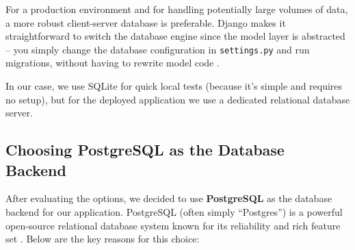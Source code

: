 For a production environment and for handling potentially large volumes of 
data, a more robust client-server database is preferable. Django makes it 
straightforward to switch the database engine since the model layer is 
abstracted – you simply change the database configuration in 
\texttt{settings.py} and run migrations, without having to rewrite model 
code \parencite{DjangoMigrations}. 

\medskip

In our case, we use SQLite for quick local tests (because it’s simple and 
requires no setup), but for the deployed application we use a dedicated 
relational database server.

\subsection{Choosing PostgreSQL as the Database Backend} 

After evaluating the options, we decided to use \textbf{PostgreSQL} as the database backend for our application. PostgreSQL (often simply “Postgres”) is a powerful open-source relational database system known for its reliability and rich feature set \parencite{PostgresAbout}. Below are the key reasons for this choice: 


